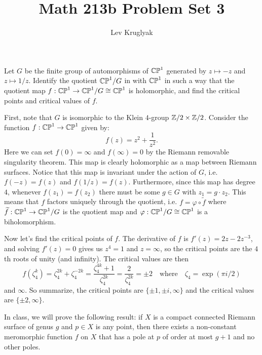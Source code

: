 \documentclass[expanded]{lkx_pset}
\title{Math 213b Problem Set 3}
\author{Lev Kruglyak}
\begin{document}
\maketitle

\begin{problem}{1}
Let $G$ be the finite group of automorphisms of $\mathbb{CP}^{1}$ generated by
$z\mapsto -z$ and $z\mapsto 1/z$. Identify the quotient $\mathbb{CP}^{1}/G$ in
with $\mathbb{CP}^{1}$ in such a way that the quotient map $f: \mathbb{CP}^{1}\to
	\mathbb{CP}^{1}/G \cong \mathbb{CP}^{1}$ is holomorphic, and find the critical points
and critical values of $f$.
\end{problem}

\begin{solution}
	First, note that $G$ is isomorphic to the Klein $4$-group $\mathbb{Z}/2\times \mathbb{Z}/2$.
	Consider the function $f : \mathbb{CP}^1 \to \mathbb{CP}^1$ given by:
	\[
		f(z) = z^2 + \frac{1}{z^2}.
	\]
	Here we can set $f(0)=\infty$ and $f(\infty)=0$ by the Riemann removable singularity theorem. This map is clearly holomorphic as a map between Riemann surfaces. Notice that this map is invariant under the action of $G$, i.e. $f(-z)=f(z)$ and $f(1/z)=f(z)$. Furthermore, since this map has degree $4$, whenever $f(z_1)=f(z_2)$ there must be some $g\in G$ with $z_1 = g\cdot z_2$. This means that $f$ factors uniquely through the quotient, i.e. $f = \varphi \circ \widetilde{f}$ where $\widetilde{f} : \mathbb{CP}^1 \to \mathbb{CP}^1/G$ is the quotient map and $\varphi : \mathbb{CP}^1/G \cong \mathbb{CP}^1$ is a biholomorphism.

	Now let's find the critical points of $f$. The derivative of $f$ is $f'(z) = 2z-2z^{-3}$, and solving $f'(z)=0$ gives us $z^4=1$ and $z=\infty$, so the critical points are the $4$th roots of unity (and infinity). The critical values are then
	\[
		f(\zeta_4^k) = \zeta_4^{2k} + \zeta_4^{-2k} = \frac{\zeta_4^{4k}+1}{\zeta_4^{2k}} = \frac{2}{\zeta_4^{2k}} = \pm 2\quad\textrm{where}\quad \zeta_4=\exp(\pi i/2)
	\]
	and $\infty$. So summarize, the critical points are $\{\pm 1, \pm i, \infty\}$ and the critical values are $\{\pm 2, \infty\}$.
\end{solution}

\begin{problem}{2}
In class, we will prove the
following result: if $X$ is a compact connected Riemann surface of
genus $g$ and $p\in X$ is any point, then there exists a non-constant meromorphic
function $f$ on $X$ that has a pole at $p$ of order at most $g+1$ and
no other poles.
\end{problem}
\end{document}
